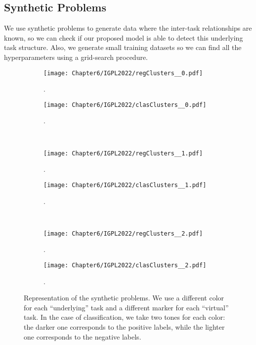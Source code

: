\subsection{Synthetic Problems}
%
We use synthetic problems to generate data where the inter-task relationships are known, so we can check if our proposed model is able to detect this underlying task structure.
%
Also, we generate small training datasets so we can find all the hyperparameters using a grid-search procedure.



\begin{figure}[t!]
    \centering
    \begin{subfigure}[b]{0.49\textwidth}
        \centering
        \texttt{[image: Chapter6/IGPL2022/regClusters\_\_0.pdf]}
        \caption{.}
        \label{regClusters0}
    \end{subfigure}
    \hfill
    \begin{subfigure}[b]{0.49\textwidth}
        \centering
        \texttt{[image: Chapter6/IGPL2022/clasClusters\_\_0.pdf]}
        \caption{.}
        \label{clasClusters0}
    \end{subfigure}
    \\
    \begin{subfigure}[b]{0.49\textwidth}
        \centering
        \texttt{[image: Chapter6/IGPL2022/regClusters\_\_1.pdf]}
        \caption{.}
        \label{regClusters1}
    \end{subfigure}
    \hfill
    \begin{subfigure}[b]{0.49\textwidth}
        \centering
        \texttt{[image: Chapter6/IGPL2022/clasClusters\_\_1.pdf]}
        \caption{.}
        \label{clasClusters1}
    \end{subfigure}
    \\
    \begin{subfigure}[b]{0.49\textwidth}
        \centering
        \texttt{[image: Chapter6/IGPL2022/regClusters\_\_2.pdf]}
        \caption{.}
        \label{regClusters2}
    \end{subfigure}
    \hfill
    \begin{subfigure}[b]{0.49\textwidth}
        \centering
        \texttt{[image: Chapter6/IGPL2022/clasClusters\_\_2.pdf]}
        \caption{.}
        \label{clasClusters2}
    \end{subfigure}
    \caption{Representation of the synthetic problems. We use a different color for each ``underlying'' task and a different marker for each ``virtual'' task. In the case of classification, we take two tones for each color: the darker one corresponds to the positive labels, while the lighter one corresponds to the negative labels.}
\end{figure}

